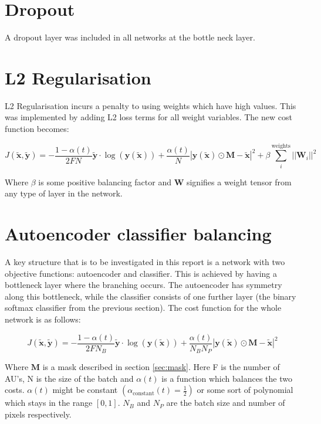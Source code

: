   \section{Dropout}
    A dropout layer was included in all networks at the bottle neck layer.
  \section{L2 Regularisation}
    L2 Regularisation incurs a penalty to using weights which have high values. This was implemented by adding L2
    loss terms for all weight variables. The new cost function becomes:

    \begin{equation} \label{eq:l2_cost_model}
        J(\tilde{\mathbf{x}},\tilde{\mathbf{y}}) = -\frac{1-\alpha(t)}{2FN}\tilde{\mathbf{y}}\cdot\log(\mathbf{y}(\tilde{\mathbf{x}}))
        + \frac{\alpha(t)}{N}\left |\mathbf{y}(\tilde{\mathbf{x}}) \odot \mathbf{M}-\tilde{\mathbf{x}}\right | ^2
        + \beta \sum_i^{\text{weights}}||\mathbf{W}_i||^2
    \end{equation}

    Where $\beta$ is some positive balancing factor and $\mathbf{W}$ signifies
    a weight tensor from any type of layer in the network.



  \section{Autoencoder classifier balancing}
    \label{sec:autoalpha}
    A key structure that is to be investigated in this report is a network with two objective functions:
    autoencoder and classifier. This is achieved by having a bottleneck layer where the branching occurs.
    The autoencoder has symmetry along this bottleneck, while the classifier consists of one further layer
    (the binary softmax classifier from the previous section). The cost function for the whole network is as follows:

    \begin{equation}
      J(\tilde{\mathbf{x}},\tilde{\mathbf{y}}) = -\frac{1-\alpha(t)}{2FN_B}\tilde{\mathbf{y}}\cdot\log(\mathbf{y}(\tilde{\mathbf{x}}))
      + \frac{\alpha(t)}{N_BN_P}\left |\mathbf{y}(\tilde{\mathbf{x}}) \odot \mathbf{M}-\tilde{\mathbf{x}}\right | ^2
    \end{equation}

    Where $\mathbf{M}$ is a mask described in section \ref{sec:mask}. Here F is the number of AU's, N is the size of the batch and $\alpha(t)$ is a
    function which balances the two costs. $\alpha(t)$ might be constant $\left ( \alpha_{\text{constant}}(t)=\frac{1}{2} \right )$ or
    some sort of polynomial which stays in the range $[0,1]$. $N_B$ and $N_P$ are the batch size and number of pixels respectively.

